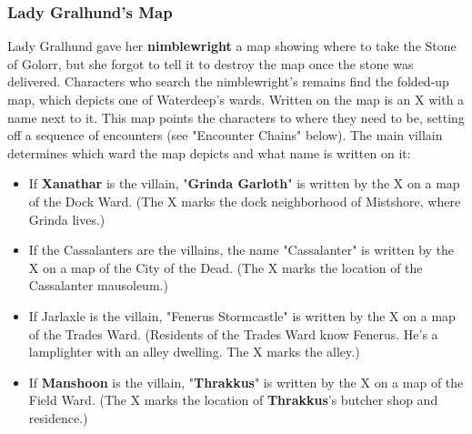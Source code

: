\documentclass[10pt,a4paper,twoside,twocolumn,openany,nodeprecatedcode]{dndbook}
\begin{document}
\subsubsection{Lady Gralhund's Map}
Lady Gralhund gave her \textbf{nimblewright} a map showing where to take the Stone of Golorr, but she forgot to tell it to destroy the map once the stone was delivered. Characters who search the nimblewright's remains find the folded-up map, which depicts one of Waterdeep's wards. Written on the map is an X with a name next to it. This map points the characters to where they need to be, setting off a sequence of encounters (see "Encounter Chains" below). The main villain determines which ward the map depicts and what name is written on it:
\begin{itemize}

\item If \textbf{Xanathar} is the villain, "\textbf{Grinda Garloth}" is written by the X on a map of the Dock Ward. (The X marks the dock neighborhood of Mistshore, where Grinda lives.)
\item If the Cassalanters are the villains, the name "Cassalanter" is written by the X on a map of the City of the Dead. (The X marks the location of the Cassalanter mausoleum.)
\item If Jarlaxle is the villain, "Fenerus Stormcastle" is written by the X on a map of the Trades Ward. (Residents of the Trades Ward know Fenerus. He's a lamplighter with an alley dwelling. The X marks the alley.)
\item If \textbf{Manshoon} is the villain, "\textbf{Thrakkus}" is written by the X on a map of the Field Ward. (The X marks the location of \textbf{Thrakkus}'s butcher shop and residence.)
\end{itemize}
\end{document}
